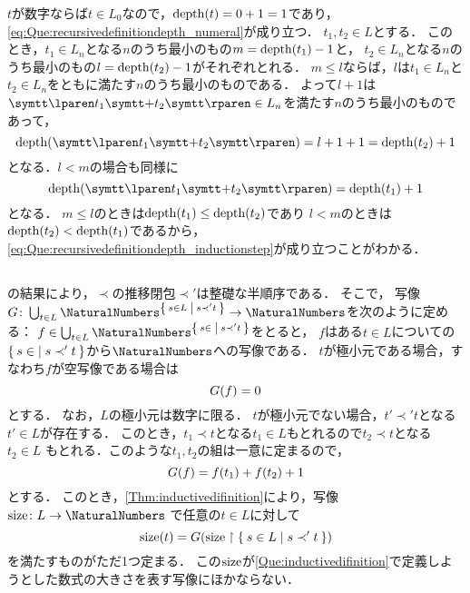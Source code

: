 \(t\)が数字ならば\(t \in L_0\)なので，\(\apply{\depth}{t} = 0 + 1 = 1\)であり，
\cref{eq:Que:recursivedefinitiondepth_numeral}が成り立つ．
\(t_1, t_2 \in L\)とする．
このとき，\(t_1 \in L_n\)となる\(n\)のうち最小のもの\(m = \apply{\depth}{t_1} - 1\)と，
\(t_2 \in L_n\)となる\(n\)のうち最小のもの\(l = \apply{\depth}{t_2} - 1\)がそれぞれとれる．
\(m \leq l\)ならば，\(l\)は\(t_1 \in L_n\)と\(t_2 \in L_n\)をともに満たす\(n\)のうち最小のものである．
よって\(l + 1\)は\(\obj{\lparen} t_1 \obj{+} t_2 \obj{\rparen} \in L_n\)を満たす\(n\)のうち最小のものであって，
\begin{equation*}
	\apply{\depth}{\obj{\lparen} t_1 \obj{+} t_2 \obj{\rparen}} = l + 1 + 1 = \apply{\depth}{t_2} + 1
\end{equation*}
となる．\(l < m\)の場合も同様に
\begin{equation*}
	\apply{\depth}{\obj{\lparen} t_1 \obj{+} t_2 \obj{\rparen}} = \apply{\depth}{t_1} + 1
\end{equation*}
となる．
\(m \leq l\)のときは\(\apply{\depth}{t_1} \leq \apply{\depth}{t_2}\)であり
\(l < m\)のときは\(\apply{\depth}{t_2} < \apply{\depth}{t_1}\)であるから，
\cref{eq:Que:recursivedefinitiondepth_inductionstep}が成り立つことがわかる．

\subsection*{}

の結果により，\(\prec\)の推移閉包\(\prec'\)は整礎な半順序である．
そこで，
写像\(G \colon \bigcup_{t \in L} \NaturalNumbers^{\Set{s \in L | s \prec' t }} \to \NaturalNumbers\)を次のように定める：
\(f \in \bigcup_{t \in L} \NaturalNumbers^{\Set{s \in | s \prec' t}}\)をとると，
\(f\)はある\(t \in L\)についての\(\Set{s \in | s \prec' t}\)から\(\NaturalNumbers\)への写像である．
\(t\)が極小元である場合，すなわち\(f\)が空写像である場合は
\[
	\apply{G}{f} = 0
\]
とする．
なお，\(L\)の極小元は数字に限る．
\(t\)が極小元でない場合，\(t' \prec' t\)となる\(t' \in L\)が存在する．
このとき，\(t_1 \prec t\)となる\(t_1 \in L\)もとれるので\(t_2 \prec t\)となる\(t_2 \in L\)
もとれる．このような\(t_1, t_2\)の組は一意に定まるので，
\[
	\apply{G}{f} = \apply{f}{t_1} + \apply{f}{t_2} + 1
\]
とする．
このとき，\cref{Thm:inductivedifinition}により，写像\({\size} \colon L \to \NaturalNumbers\)
で任意の\(t \in L\)に対して
\[
	\apply{\size}{t} = \apply{G}{ \size \restriction \Set{s \in L | s \prec' t}}
\]
を満たすものがただ1つ定まる．
この\(\operatorname{size}\)が\cref{Que:inductivedifinition}で定義しようとした数式の大きさを表す写像にほかならない．


